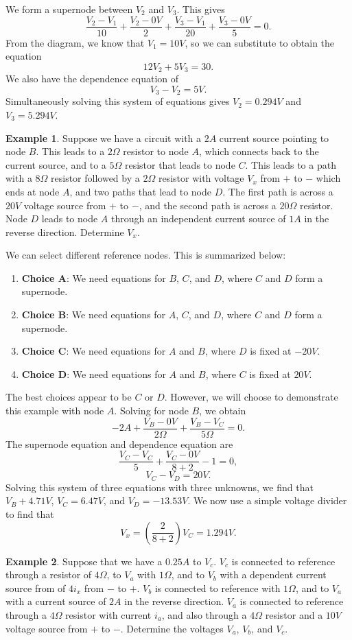 \documentclass[11pt]{article}
\theoremstyle{plain} %
\theoremstyle{definition}
\theoremstyle{example}
\newtheorem*{example}{Example}
\theoremstyle{remark}
\begin{document}
We form a supernode between $V_2$ and $V_3$. This gives
$$\frac{V_2-V_1}{10} + \frac{V_2-0V}{2} + \frac{V_3-V_1}{20} + \frac{V_3-0V}{5} = 0.$$
From the diagram, we know that $V_1 = 10V$, so we can substitute to obtain the equation 
$$12V_2 +5V_3 = 30.$$
We also have the dependence equation of 
$$V_3-V_2 = 5V.$$
Simultaneously solving this system of equations gives $V_2 = 0.294V$ and $V_3 = 5.294V$. 


\begin{example}
Suppose we have a circuit with a $2A$ current source pointing to node $B$. This leads to a $2\Omega$ resistor to node $A$, which connects back to the current source, and to a $5\Omega$ resistor that leads to node $C$. This leads to a path with a $8\Omega$ resistor followed by a $2\Omega$ resistor with voltage $V_x$ from $+$ to $-$ which ends at node $A$, and two paths that lead to node $D$. The first path is across a $20V$ voltage source from $+$ to $-$, and the second path is across a $20\Omega$ resistor. Node $D$ leads to node $A$ through an independent current source of $1A$ in the reverse direction. Determine $V_x$.
\end{example}

We can select different reference nodes. This is summarized below:
\begin{enumerate}
	\item \textbf{Choice A}: We need equations for $B$, $C$, and $D$, where $C$ and $D$ form a supernode.
	\item \textbf{Choice B}: We need equations for $A$, $C$, and $D$, where $C$ and $D$ form a supernode.
	\item \textbf{Choice C}: We need equations for $A$ and $B$, where $D$ is fixed at $-20V$.
	\item \textbf{Choice D}: We need equations for $A$ and $B$, where $C$ is fixed at $20V$.
\end{enumerate}
The best choices appear to be $C$ or $D$. However, we will choose to demonstrate this example with node $A$. Solving for node $B$, we obtain 
$$-2A + \frac{V_B-0V}{2\Omega} + \frac{V_B-V_C}{5\Omega} = 0.$$
The supernode equation and dependence equation are 
$$\frac{V_C-V_C}{5} + \frac{V_C-0V}{8+2}-1=0,$$
$$V_C-V_D=20V.$$
Solving this system of three equations with three unknowns, we find that $V_B+ 4.71V$, $V_C = 6.47V$, and $V_D = -13.53V$. We now use a simple voltage divider to find that 
$$V_x = \left(\frac{2}{8+2}\right)V_C = 1.294V.$$

\begin{example}
Suppose that we have a $0.25A$ to $V_c$. $V_c$ is connected to reference through a resistor of  $4\Omega$, to $V_a$ with $1\Omega$, and to $V_b$ with a dependent current source from of $4i_x$ from $-$ to $+$. $V_b$ is connected to reference with $1\Omega$, and to $V_a$ with a current source of $2A$ in the reverse direction. $V_a$ is connected to reference through a $4\Omega$ resistor with current $i_a$, and also through a $4\Omega$ resistor and a $10V$ voltage source from $+$ to $-$. Determine the voltages $V_a$, $V_b$, and $V_c$. 
\end{example}
\end{document}
